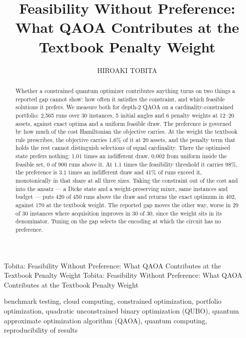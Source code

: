 \documentclass{ieeeaccess}
\begin{document}

\title{Feasibility Without Preference: What QAOA Contributes at the Textbook Penalty Weight}
\author{\uppercase{Hiroaki Tobita}}
\address[1]{Advanced Institute of Industrial Technology, Tokyo 140-0011, Japan (e-mail: tobita-hiroaki@aiit.ac.jp)}

\markboth
{Tobita: Feasibility Without Preference: What QAOA Contributes at the Textbook Penalty Weight}
{Tobita: Feasibility Without Preference: What QAOA Contributes at the Textbook Penalty Weight}




\begin{abstract}
Whether a constrained quantum optimizer contributes anything turns on two things a reported gap cannot show: how often it satisfies the constraint, and which feasible solutions it prefers. We measure both for depth-2 QAOA on a cardinality-constrained portfolio: 2,565 runs over 30 instances, 5 initial angles and 6 penalty weights at 12--20 assets, against exact optima and a uniform feasible draw. The preference is governed by how much of the cost Hamiltonian the objective carries. At the weight the textbook rule prescribes, the objective carries 1.6\% of it at 20 assets, and the penalty term that holds the rest cannot distinguish selections of equal cardinality. There the optimised state prefers nothing: 1.01 times an indifferent draw, 0.002 from uniform inside the feasible set, 0 of 900 runs above it. At 1.1 times the feasibility threshold it carries 98\%, the preference is 3.1 times an indifferent draw and 41\% of runs exceed it, monotonically in that share at all three sizes. Taking the constraint out of the cost and into the ansatz --- a Dicke state and a weight-preserving mixer, same instances and budget --- puts 420 of 450 runs above the draw and returns the exact optimum in 402, against 170 at the textbook weight. The reported gap moves the other way, worse in 29 of 30 instances where acquisition improves in 30 of 30, since the weight sits in its denominator. Tuning on the gap selects the encoding at which the circuit has no preference.
\end{abstract}

\begin{keywords}
benchmark testing, cloud computing, constrained optimization, portfolio optimization, quadratic unconstrained binary optimization (QUBO), quantum approximate optimization algorithm (QAOA), quantum computing, reproducibility of results
\end{keywords}
\end{document}
